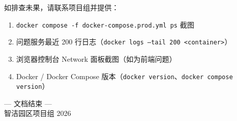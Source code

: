 \documentclass[UTF8,a4paper,11pt]{ctexart}
\begin{document}
\vspace{1em}
\begin{infobox}[技术支持]
如排查未果，请联系项目组并提供：
\begin{enumerate}[leftmargin=1.4em,itemsep=1pt]
  \item \texttt{docker compose -f docker-compose.prod.yml ps} 截图
  \item 问题服务最近 200 行日志（\texttt{docker logs --tail 200 <container>}）
  \item 浏览器控制台 Network 面板截图（如为前端问题）
  \item Docker / Docker Compose 版本（\texttt{docker version}、\texttt{docker compose version}）
\end{enumerate}
\end{infobox}

\vspace{2em}
\begin{center}
\color{gray}\small --- 文档结束 ---\\[2pt]
智洁园区项目组 \textperiodcentered{} 2026
\end{center}
\end{document}
